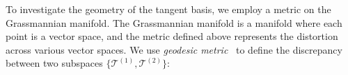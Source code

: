 






To investigate the geometry of the tangent basis, we employ a metric on the Grassmannian manifold. The Grassmannian manifold is a manifold where each point is a vector space, and the metric defined above represents the distortion across various vector spaces.
We use \emph{geodesic metric}~\cite{choi2021not, ye2016schubert} to define the discrepancy between two subspaces $\{\mathcal{T}^{(1)}, \mathcal{T}^{(2)}\}$: 


